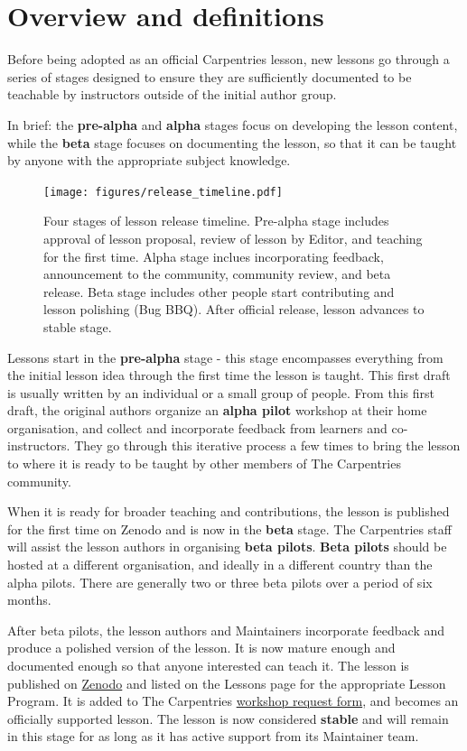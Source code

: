 \documentclass[
]{book}
\begin{document}
\hypertarget{overview-and-definitions}{%
\section{Overview and definitions}\label{overview-and-definitions}}

Before being adopted as an official Carpentries lesson,
new lessons go through a series of stages designed to
ensure they are sufficiently documented to be teachable
by instructors outside of the initial author group.

In brief: the \textbf{pre-alpha} and \textbf{alpha} stages focus on
developing the lesson content, while the \textbf{beta} stage
focuses on documenting the lesson, so that it can be
taught by anyone with the appropriate subject knowledge.

\begin{figure}
\centering
\texttt{[image: figures/release\_timeline.pdf]}
\caption{\label{fig:release-timeline}Four stages of lesson release timeline. Pre-alpha stage includes approval of lesson proposal, review of lesson by Editor, and teaching for the first time. Alpha stage inclues incorporating feedback, announcement to the community, community review, and beta release. Beta stage includes other people start contributing and lesson polishing (Bug BBQ). After official release, lesson advances to stable stage.}
\end{figure}

Lessons start in the \textbf{pre-alpha} stage - this stage
encompasses everything from the initial lesson idea
through the first time the lesson is taught. This
first draft is usually written by an individual
or a small group of people. From this first draft, the
original authors organize an \textbf{alpha pilot} workshop at
their home organisation, and collect and incorporate
feedback from learners and co-instructors. They go
through this iterative process a few times to bring the
lesson to where it is ready to be taught by other
members of The Carpentries community.

When it is ready for broader teaching and contributions,
the lesson is published for
the first time on Zenodo and is now in the \textbf{beta}
stage. The Carpentries staff will assist the lesson
authors in organising \textbf{beta pilots}.
\textbf{Beta pilots}
should be hosted at a different organisation, and
ideally in a different country than the alpha pilots.
There are generally two or three beta pilots over a
period of six months.

After beta pilots, the lesson authors and Maintainers
incorporate feedback and produce a polished version of
the lesson. It is now mature enough and
documented enough so that anyone interested can teach it. The lesson is published on \href{https://zenodo.org/communities/carpentries/?page=1\&size=20}{Zenodo} and listed on the
Lessons page for the appropriate
Lesson Program. It is added to The Carpentries
\href{http://carpentries.org/request-workshop}{workshop request form}, and becomes an officially
supported lesson. The lesson is now considered \textbf{stable} and will remain in this stage for as long
as it has active support from its Maintainer team.
\end{document}
